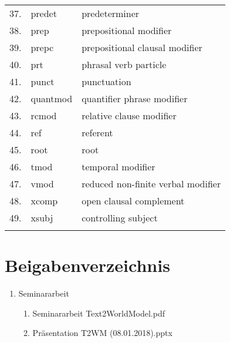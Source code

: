 \begin{longtable}{|l|l|l|}
37. & predet & predeterminer\\
38. & prep & prepositional modifier\\
39. & prepc & prepositional clausal modifier\\
40. & prt & phrasal verb particle\\
41. & punct & punctuation\\
42. & quantmod & quantifier phrase modifier\\
43. & rcmod & relative clause modifier\\
44. & ref & referent\\
45. & root & root\\
46. & tmod & temporal modifier\\
47. & vmod & reduced non-finite verbal modifier\\
48. & xcomp & open clausal complement\\
49. & xsubj & controlling subject\\
\label{table:DEPTAGS}
\end{longtable}

\section{Beigabenverzeichnis}
\begin{enumerate}
	\item Seminararbeit
	\begin{enumerate}
		\item Seminararbeit Text2WorldModel.pdf
		\item Präsentation T2WM (08.01.2018).pptx
	\end{enumerate}

\end{enumerate} 

